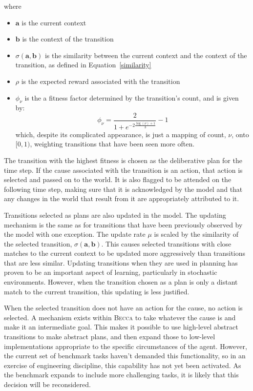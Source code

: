 where
\begin{itemize}
\item $\mathbf{a}$ is the current context
\item $\mathbf{b}$ is the context of the transition
\item $\sigma(\mathbf{a},\mathbf{b}) $ is the similarity between the current context and the context of the transition, as defined in Equation~\ref{similarity}
\item $\rho$ is the expected reward associated with the transition
\item $\phi_\nu$ is the a fitness factor determined by the transition's count, and is given by:
\begin{equation}
\phi_\nu = \frac{2}{1 + e^{-2 \frac{\log(\nu) + 1}{3}}} - 1
\end{equation}
which, despite its complicated appearance, is just a mapping of count, $\nu$, onto $[0,1)$, weighting transitions that have been seen more often.
\end{itemize}

The transition with the highest fitness is chosen as the deliberative plan for the time step. If the cause associated with the transition is an action, that action is selected and passed on to the world. It is also flagged to be attended on the following time step, making sure that it is acknowledged by the model and that any changes in the world that result from it are appropriately attributed to it.

Transitions selected as plans are also updated in the model. The updating mechanism is the same as for transitions that have been previously observed by the model with one exception. The update rate $\mu$ is scaled by the similarity of the selected transition, $\sigma(\mathbf{a},\mathbf{b})$. This causes selected transitions with close matches to the current context to be updated more aggressively than transitions that are less similar. Updating transitions when they are used in planning has proven to be an important aspect of learning, particularly in stochastic environments. However, when the transition chosen as a plan is only a distant match to the current transition, this updating is less justified.

When the selected transition does not have an action for the cause, no action is selected. A mechanism exists within \textsc{Becca} to take whatever the cause is and make it an intermediate goal. This makes it possible to use high-level abstract transitions to make abstract plans, and then expand those to low-level implementations appropriate to the specific circumstances of the agent. However, the current set of benchmark tasks haven't demanded this functionality, so in an exercise of engineering discipline, this capability has not yet been activated. As the benchmark expands to include more challenging tasks, it is likely that this decision will be reconsidered.

